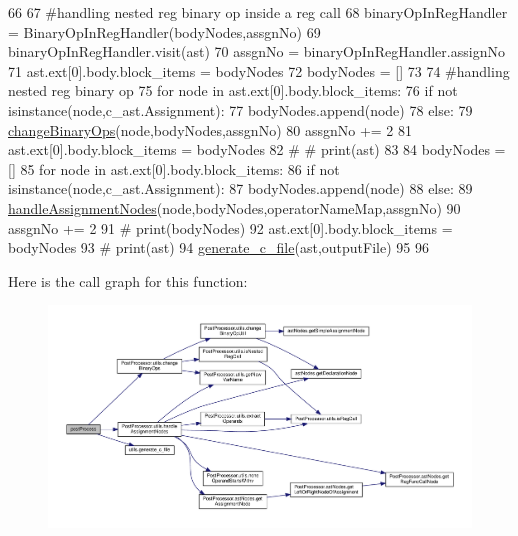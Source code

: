 \begin{DoxyCode}
66 
67 \textcolor{comment}{#handling nested reg binary op inside a reg call
}
68     binaryOpInRegHandler = BinaryOpInRegHandler(bodyNodes,assgnNo)
69     binaryOpInRegHandler.visit(ast)
70     assgnNo = binaryOpInRegHandler.assignNo
71     ast.ext[0].body.block\_items = bodyNodes
72     bodyNodes = []
73 
74 \textcolor{comment}{#handling nested reg binary op
}
75     \textcolor{keywordflow}{for} node \textcolor{keywordflow}{in} ast.ext[0].body.block\_items:
76         \textcolor{keywordflow}{if} \textcolor{keywordflow}{not} isinstance(node,c\_ast.Assignment):
77             bodyNodes.append(node)
78         \textcolor{keywordflow}{else}:
79             \hyperlink{namespacePostProcessor_1_1utils_a1ea8f909bf93721481e4fd1bd3f2dff1}{changeBinaryOps}(node,bodyNodes,assgnNo)
80             assgnNo += 2
81     ast.ext[0].body.block\_items = bodyNodes
82     \textcolor{comment}{# # print(ast)
}
83 
84     bodyNodes = []
85     \textcolor{keywordflow}{for} node \textcolor{keywordflow}{in} ast.ext[0].body.block\_items:
86         \textcolor{keywordflow}{if} \textcolor{keywordflow}{not} isinstance(node,c\_ast.Assignment):
87             bodyNodes.append(node)
88         \textcolor{keywordflow}{else}:
89             \hyperlink{namespacePostProcessor_1_1utils_a8b77a1f205d7dac14e6bdcccdb61e5f6}{handleAssignmentNodes}(node,bodyNodes,operatorNameMap,assgnNo)
90             assgnNo += 2
91     \textcolor{comment}{# print(bodyNodes)
}
92     ast.ext[0].body.block\_items = bodyNodes
93     \textcolor{comment}{# print(ast)
}
94     \hyperlink{namespaceutils_a5ab527c9affdfd39949f2e88c4299989}{generate\_c\_file}(ast,outputFile)
95 
96 
\end{DoxyCode}
Here is the call graph for this function\+:\nopagebreak
\begin{figure}[H]
\begin{center}
\leavevmode
\includegraphics[width=350pt]{namespacePostProcessor_1_1processor_a3f18e4947e2313a8b23367f06f4b02c2_cgraph}
\end{center}
\end{figure}


